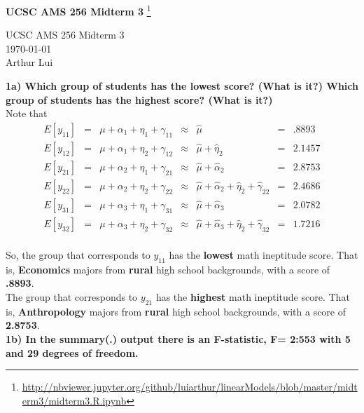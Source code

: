 \documentclass[11pt]{article}
\def\wl{\par \vspace{\baselineskip}\noindent}
\def\hline{ \textcolor{lgrey}{\hrulefill} }
\begin{document}
\begin{center}
  {\huge \textbf{UCSC AMS 256 Midterm 3}
    \footnote{\url{http://nbviewer.jupyter.org/github/luiarthur/linearModels/blob/master/midterm3/midterm3.R.ipynb}}
  }\\
  \wl
  UCSC AMS 256 Midterm 3\\
  \noindent\today\\
  Arthur Lui\\
  \hline
\end{center}

\noindent
\textbf{1a) Which group of students has the lowest score? (What is it?) Which group of students has the highest score? (What is it?)}\\

\noindent
Note that 
$$
\begin{array}{rclclcr}
    E[y_{11}] &=& \mu + \alpha_1 + \eta_1 + \gamma_{11} &\approx& \hat\mu &=& .8893 \\
    E[y_{12}] &=& \mu + \alpha_1 + \eta_2 + \gamma_{12} &\approx& \hat\mu +\hat\eta_2 &=& 2.1457 \\
    E[y_{21}] &=& \mu + \alpha_2 + \eta_1 + \gamma_{21} &\approx& \hat\mu +\hat\alpha_2 &=& 2.8753 \\
    E[y_{22}] &=& \mu + \alpha_2 + \eta_2 + \gamma_{22} &\approx& \hat\mu + \hat\alpha_2 + \hat\eta_2 + \hat\gamma_{22}&=& 2.4686 \\
    E[y_{31}] &=& \mu + \alpha_3 + \eta_1 + \gamma_{31} &\approx& \hat\mu +\hat\alpha_3 &=& 2.0782 \\
    E[y_{32}] &=& \mu + \alpha_3 + \eta_2 + \gamma_{32} &\approx& \hat\mu + \hat\alpha_3 + \hat\eta_2 + \hat\gamma_{32}&=& 1.7216 \\
\end{array}
$$

\noindent
So, the group that corresponds to $y_{11}$ has the \textbf{lowest} math
ineptitude score. That is, \textbf{Economics} majors from \textbf{rural} high
school backgrounds, with a score of \textbf{.8893}.\\

\noindent
The group that corresponds to $y_{21}$ has the \textbf{highest} math ineptitude
score. That is, \textbf{Anthropology} majors from \textbf{rural} high school
backgrounds, with a score of \textbf{2.8753}.\\

\noindent
\textbf{1b) In the summary(.) output there is an F-statistic, F= 2:553 with 5 and 29 degrees of freedom.}
\end{document}
